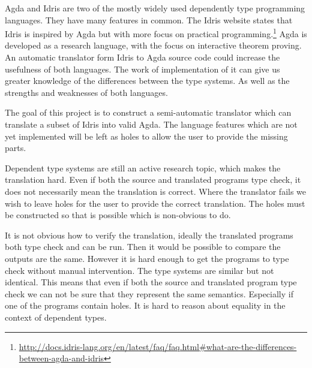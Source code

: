 \documentclass[parskip=half]{scrartcl}
\begin{document}
Agda and Idris are two of the mostly widely used dependently type programming
languages. They have many features in common. The Idris website states that Idris is inspired
by Agda but with more focus on practical
programming.\footnote{\url{http://docs.idris-lang.org/en/latest/faq/faq.html\#what-are-the-differences-between-agda-and-idris}}
Agda is developed as a research language, with the focus on interactive theorem
proving.
An automatic translator form Idris to Agda source code could increase the
usefulness of both languages. The work of implementation of it can give us
greater knowledge of the differences between the type systems. As well as the
strengths and weaknesses of both languages.

The goal of this project is to construct a semi-automatic translator which can
translate a subset of Idris into valid Agda. The language features which are
not yet implemented will be left as holes to allow the user to provide the
missing parts.



Dependent type systems are still an active research topic, which makes the
translation hard.
Even if both the source and translated programs type check, it does not
necessarily mean the translation is correct.  Where the translator fails we
wish to leave holes for the user to provide the correct translation. The holes
must be constructed so that is possible which is non-obvious to do.

It is not obvious how to verify the translation, ideally the translated
programs both type check and can be run. Then it would be possible to compare
the outputs are the same. However it is hard enough to get the programs to type
check without manual intervention. The type systems are similar but not
identical. This means that even if both the source and translated program
type check we can not be sure that they represent the same semantics.
Especially if one of the programs contain holes. It is hard to reason about
equality in the context of dependent types.
\end{document}
